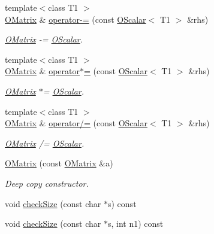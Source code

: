 \begin{DoxyCompactItemize}
{\footnotesize template$<$class T1 $>$ }\\\mbox{\hyperlink{classENSEM_1_1OMatrix}{O\+Matrix}} \& \mbox{\hyperlink{classENSEM_1_1OMatrix_a53a1a690a2f39f0c64c6d261efc00e4c}{operator-\/=}} (const \mbox{\hyperlink{classENSEM_1_1OScalar}{O\+Scalar}}$<$ T1 $>$ \&rhs)
\begin{DoxyCompactList}\small\item\em \mbox{\hyperlink{classENSEM_1_1OMatrix}{O\+Matrix}} -\/= \mbox{\hyperlink{classENSEM_1_1OScalar}{O\+Scalar}}. \end{DoxyCompactList}\item 
{\footnotesize template$<$class T1 $>$ }\\\mbox{\hyperlink{classENSEM_1_1OMatrix}{O\+Matrix}} \& \mbox{\hyperlink{classENSEM_1_1OMatrix_a40e18b83c9eb609f7529e65c515010c2}{operator$\ast$=}} (const \mbox{\hyperlink{classENSEM_1_1OScalar}{O\+Scalar}}$<$ T1 $>$ \&rhs)
\begin{DoxyCompactList}\small\item\em \mbox{\hyperlink{classENSEM_1_1OMatrix}{O\+Matrix}} $\ast$= \mbox{\hyperlink{classENSEM_1_1OScalar}{O\+Scalar}}. \end{DoxyCompactList}\item 
{\footnotesize template$<$class T1 $>$ }\\\mbox{\hyperlink{classENSEM_1_1OMatrix}{O\+Matrix}} \& \mbox{\hyperlink{classENSEM_1_1OMatrix_a46dc90e0e33442dcdcb9e98f9cf0025e}{operator/=}} (const \mbox{\hyperlink{classENSEM_1_1OScalar}{O\+Scalar}}$<$ T1 $>$ \&rhs)
\begin{DoxyCompactList}\small\item\em \mbox{\hyperlink{classENSEM_1_1OMatrix}{O\+Matrix}} /= \mbox{\hyperlink{classENSEM_1_1OScalar}{O\+Scalar}}. \end{DoxyCompactList}\item 
\mbox{\hyperlink{classENSEM_1_1OMatrix_a695677059e35f7e9933f2b55d2eacb52}{O\+Matrix}} (const \mbox{\hyperlink{classENSEM_1_1OMatrix}{O\+Matrix}} \&a)
\begin{DoxyCompactList}\small\item\em Deep copy constructor. \end{DoxyCompactList}\item 
void \mbox{\hyperlink{classENSEM_1_1OMatrix_abec80929ab7e8e2a23822fbbc841bd87}{check\+Size}} (const char $\ast$s) const
\item 
void \mbox{\hyperlink{classENSEM_1_1OMatrix_a8e4c3a86b8055f6e67c8fd914b2898ca}{check\+Size}} (const char $\ast$s, int n1) const

\end{DoxyCompactItemize}
